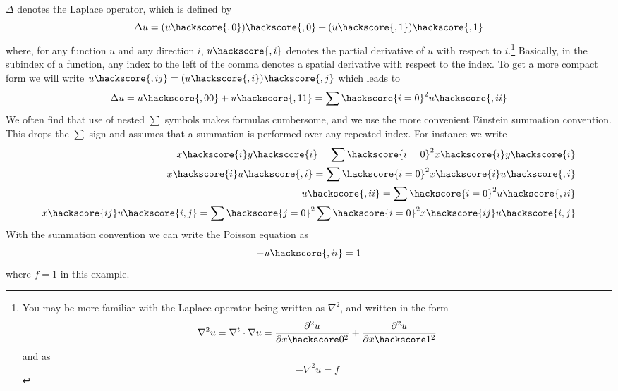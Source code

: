 $\Delta$ denotes the Laplace operator, which is defined by
\begin{equation}
\Delta u = (u\hackscore {,0})\hackscore{,0}+(u\hackscore{,1})\hackscore{,1}
\label{eq:FirstSteps.1.1}
\end{equation}
where, for any function $u$ and any direction $i$, $u\hackscore{,i}$
denotes the partial derivative  of $u$ with respect
to $i$.\footnote{You may be more familiar with the Laplace
operator being written as $\nabla^2$, and written in
the form
\begin{equation*}
    \nabla^2 u = \nabla^t \cdot \nabla u =  \frac{\partial^2 u}{\partial x\hackscore 0^2} 
    + \frac{\partial^2 u}{\partial  x\hackscore 1^2}
\end{equation*}
and  as
\begin{equation*}
    -\nabla^2 u = f
\end{equation*}
}
Basically, in the subindex of a function, any index to the left of the comma denotes a spatial derivative with respect 
to the index. To get a more compact form we will write $u\hackscore{,ij}=(u\hackscore {,i})\hackscore{,j}$
which leads to
\begin{equation}
\Delta u = u\hackscore{,00}+u\hackscore{,11}=\sum\hackscore{i=0}^2 u\hackscore{,ii}
\label{eq:FirstSteps.1.1b}
\end{equation}
We often find that use
of nested $\sum$ symbols makes formulas cumbersome, and we use the more
convenient Einstein summation convention. This 
drops the $\sum$ sign and assumes that a summation is performed over any repeated index.
For instance we write
\begin{eqnarray}
x\hackscore{i}y\hackscore{i}=\sum\hackscore{i=0}^2 x\hackscore{i}y\hackscore{i}   \\
x\hackscore{i}u\hackscore{,i}=\sum\hackscore{i=0}^2 x\hackscore{i}u\hackscore{,i}   \\
u\hackscore{,ii}=\sum\hackscore{i=0}^2 u\hackscore{,ii} \\
x\hackscore{ij}u\hackscore{i,j}=\sum\hackscore{j=0}^2\sum\hackscore{i=0}^2 x\hackscore{ij}u\hackscore{i,j}   \\
\label{eq:FirstSteps.1.1c}
\end{eqnarray}
With the summation convention we can write the Poisson equation  as
\begin{equation}
- u\hackscore{,ii} =1 
\label{eq:FirstSteps.1.sum}
\end{equation}
where $f=1$ in this example.

